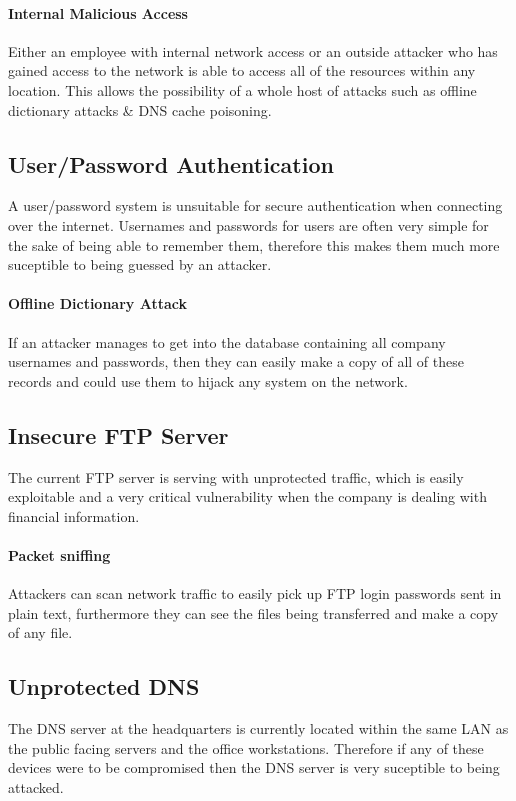 \documentclass[11pt]{article}
\begin{document}
      \paragraph{Internal Malicious Access}
        Either an employee with internal network access or an outside attacker who has gained access to the network is able to access all of the resources within any location. This allows the possibility of a whole host of attacks such as offline dictionary attacks \& DNS cache poisoning.

    \subsection{User/Password Authentication}
      A user/password system is unsuitable for secure authentication when connecting over the internet. Usernames and passwords for users are often very simple for the sake of being able to remember them, therefore this makes them much more suceptible to being guessed by an attacker.

      \paragraph{Offline Dictionary Attack}
        If an attacker manages to get into the database containing all company usernames and passwords, then they can easily make a copy of all of these records and could use them to hijack any system on the network.

    \subsection{Insecure FTP Server}
      The current FTP server is serving with unprotected traffic, which is easily exploitable and a very critical vulnerability when the company is dealing with financial information.

      \paragraph{Packet sniffing}
        Attackers can scan network traffic to easily pick up FTP login passwords sent in plain text, furthermore they can see the files being transferred and make a copy of any file.

    \subsection{Unprotected DNS}
      The DNS server at the headquarters is currently located within the same LAN as the public facing servers and the office workstations. Therefore if any of these devices were to be compromised then the DNS server is very suceptible to being attacked.
\end{document}
